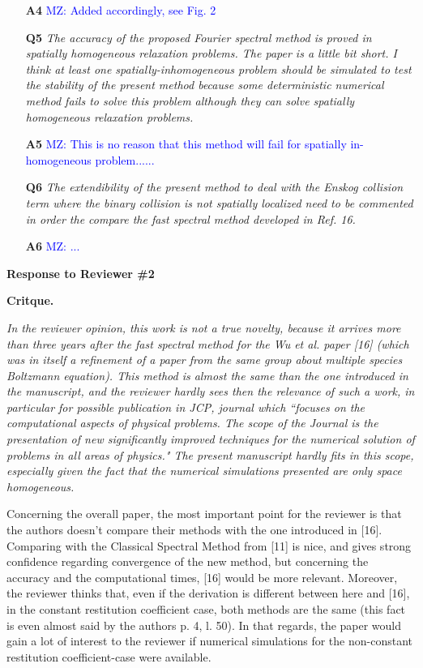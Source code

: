 \documentclass[11pt]{article}
\newcommand{\mz}[1]{\textcolor{blue}{MZ: #1}}
\begin{document}
\begin{itemize}
\item[{\bf A4}] \mz{Added accordingly, see Fig. 2}


\item[{\bf Q5}] {\it The accuracy of the proposed Fourier spectral method is proved in spatially homogeneous relaxation problems. The paper is a little bit short. I think at least one spatially-inhomogeneous problem should be simulated to test the stability of the present method because some deterministic numerical method fails to solve this problem although they can solve spatially homogeneous relaxation problems. }

\item[{\bf A5}] \mz{This is no reason that this method will fail for spatially in-homogeneous problem......}

\item[{\bf Q6}] {\it The extendibility of the present method to deal with the Enskog collision term where the binary collision is not spatially localized need to be commented in order the compare the fast spectral method developed in Ref. 16. }

\item[{\bf A6}] \mz{...}


\end{itemize}




\vspace{0.3in}
\centerline{{\large \bf{Response to Reviewer \#2}}}
\bigskip

{\bf Critque.} {\it In the reviewer opinion, this work is not a true novelty, because it arrives more than three years after the fast spectral method for the Wu et al. paper [16] (which was in itself a refinement of a paper from the same group about multiple species Boltzmann equation). This method is almost the same than the one introduced in the manuscript, and the reviewer hardly sees then the relevance of such a work, in particular for possible publication in JCP, journal which ``focuses on the computational aspects of physical problems. The scope of the Journal is the presentation of new significantly improved techniques for the numerical solution of problems in all areas of physics." The present manuscript hardly fits in this scope, especially given the fact that the numerical simulations presented are only space homogeneous.

Concerning the overall paper, the most important point for the reviewer is that the authors doesn't compare their methods with the one introduced in [16]. Comparing with the Classical Spectral Method from [11] is nice, and gives strong confidence regarding convergence of the new method, but concerning the accuracy and the computational times, [16] would be more relevant. Moreover, the reviewer thinks that, even if the derivation is different between here and [16], in the constant restitution coefficient case, both methods are the same (this fact is even almost said by the authors p. 4, l. 50). In that regards, the paper would gain a lot of interest to the reviewer if numerical simulations for the non-constant restitution coefficient-case were available.
}
\end{document}
